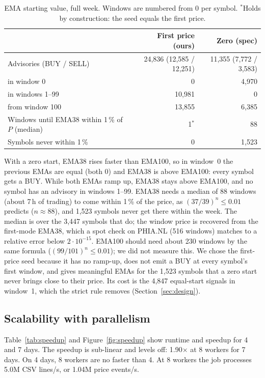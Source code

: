 \documentclass[sigconf,nonacm]{acmart}
\begin{document}
\begin{table}[t]
\caption{EMA starting value, full week. Windows are numbered from 0 per symbol.
$^*$Holds by construction: the seed equals the first price.}\label{tab:emainit}
\small
\begin{tabular}{lrr}
\toprule
 & First price (ours) & Zero (spec) \\
\midrule
Advisories (BUY / SELL)       & 24,836 (12,585 / 12,251) & 11,355 (7,772 / 3,583) \\
\quad in window 0             & 0      & 4,970 \\
\quad in windows 1--99        & 10,981 & 0 \\
\quad from window 100         & 13,855 & 6,385 \\
Windows until EMA38 within 1\,\% of $P$ (median) & 1$^*$ & 88 \\
Symbols never within 1\,\%    & 0      & 1,523 \\
\bottomrule
\end{tabular}
\end{table}

With a zero start, EMA38 rises faster than EMA100, so in window~0 the previous
EMAs are equal (both 0) and EMA38 is above EMA100: every symbol gets a BUY.
While both EMAs ramp up, EMA38 stays above EMA100, and no symbol has an
advisory in windows 1--99. EMA38 needs a median of 88 windows (about 7\,h of
trading) to come within 1\,\% of the price, as $(37/39)^n \le 0.01$ predicts
($n \approx 88$), and 1,523 symbols never get there within the week. The
median is over the 3,447 symbols that do; the window price is recovered from
the first-mode EMA38, which a spot check on PHIA.NL (516 windows) matches to a
relative error below $2\cdot10^{-15}$. EMA100 should need about 230 windows by the
same formula ($(99/101)^n \le 0.01$); we did not measure this. We chose the
first-price seed because it has no ramp-up, does not emit a BUY at every
symbol's first window, and gives meaningful EMAs for the 1,523 symbols that a
zero start never brings close to their price. Its cost is the 4,847
equal-start signals in window~1, which the strict rule removes
(Section~\ref{sec:design}).

\subsection{Scalability with parallelism}
Table~\ref{tab:speedup} and Figure~\ref{fig:speedup} show runtime and speedup
for 4 and 7 days. The speedup is sub-linear and levels off: 1.90$\times$ at 8
workers for 7 days. On 4 days, 8 workers are no faster than 4. At 8 workers the
job processes 5.0M CSV lines/s, or 1.04M price events/s.
\end{document}
